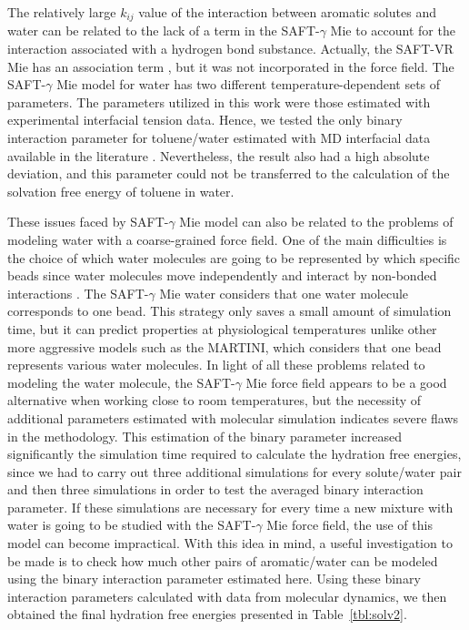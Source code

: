 \documentclass[final,12p,times,twocolumn]{elsarticle}
\begin{document}
	The relatively large $k_{ij}$ value of the interaction between aromatic solutes and water can be related to the lack of a term in the SAFT-$\gamma$ Mie to account for the interaction associated with a hydrogen bond substance. Actually, the SAFT-VR Mie has an association term \cite{lafitte2013}, but it was not incorporated in the force field. The SAFT-$\gamma$ Mie model for water \cite{lobanova2016} has two different temperature-dependent sets of parameters. The parameters utilized in this work were those estimated with experimental interfacial tension data. Hence, we tested the only binary interaction parameter for toluene/water estimated with MD interfacial data available in the literature \cite{herdes2017}. Nevertheless, the result also had a high absolute deviation, and this parameter could not be transferred to the calculation of the solvation free energy of toluene in water. 
	
	These issues faced by SAFT-$\gamma$ Mie model can also be related to the problems of modeling water with a coarse-grained force field. One of the main difficulties is the choice of which water molecules are going to be represented by which specific beads since water molecules move independently and interact by non-bonded interactions \cite{hadley2010,hadley2012}. The  SAFT-$\gamma$ Mie water considers that one water molecule corresponds to one bead. This strategy only saves a small amount of simulation time, but it can predict properties at physiological temperatures unlike other more aggressive models such as the MARTINI, which considers that one bead represents various water molecules. In light of all these problems related to modeling the water molecule, the SAFT-$\gamma$ Mie force field appears to be a good alternative when working close to room temperatures, but the necessity of additional parameters estimated with molecular simulation indicates severe flaws in the methodology. This estimation of the binary parameter increased significantly the simulation time required to calculate the hydration free energies, since we had to carry out three additional simulations for every solute/water pair and then three simulations in order to test the averaged binary interaction parameter. If these simulations are necessary for every time a new mixture with water is going to be studied with the SAFT-$\gamma$ Mie force field, the use of this model can become impractical.  With this idea in mind, a useful investigation to be made is to check how much other pairs of aromatic/water can be modeled using the binary interaction parameter estimated here. Using these binary interaction parameters calculated with data from molecular dynamics, we then obtained the final hydration free energies presented in Table~\ref{tbl:solv2}. 
	
\end{document}
